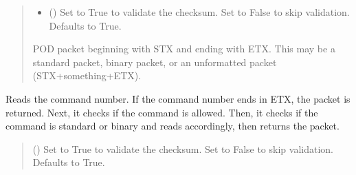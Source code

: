 \documentclass[letterpaper,10pt,english]{sphinxmanual}
\begin{document}
\begin{fulllineitems}
\begin{fulllineitems}
\begin{quote}
\begin{description}
\begin{itemize}
\item {} 
\sphinxAtStartPar
{} (\sphinxstyleliteralemphasis{\sphinxupquote{, }}) \textendash{} Set to True to validate the checksum. Set to False to skip                     validation. Defaults to True.

\end{itemize}

\sphinxAtStartPar
POD packet beginning with STX and ending with ETX. This may                 be a standard packet, binary packet, or an unformatted packet (STX+something+ETX).

\sphinxAtStartPar
{\hyperref[\detokenize{PodApi.Packets:PodApi.Packets.Packet.Packet}]{}}

\end{description}\end{quote}

\end{fulllineitems}


\begin{fulllineitems}
\label{\detokenize{PodApi.Devices:PodApi.Devices.BasicPodProtocol.Pod._ReadPODpacket_Recursive}}
\pysigstartsignatures
{}
\pysigstopsignatures
\sphinxAtStartPar
Reads the command number. If the command number ends in ETX, the packet is returned.         Next, it checks if the command is allowed. Then, it checks if the command is standard or         binary and reads accordingly, then returns the packet.
\begin{quote}\begin{description}
\sphinxAtStartPar
{} (\sphinxstyleliteralemphasis{\sphinxupquote{, }}) \textendash{} Set to True to validate the checksum. Set to False to                 skip validation. Defaults to True.


\end{description}
\end{quote}
\end{fulllineitems}
\end{fulllineitems}
\end{document}
